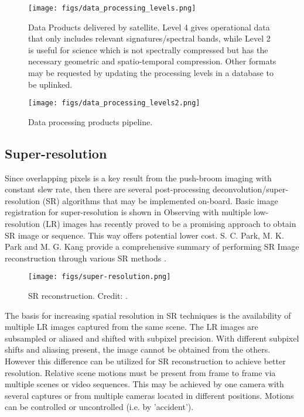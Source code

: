 \begin{figure}[htbp]
  \centering
      \texttt{[image: figs/data\_processing\_levels.png]}
  \caption{Data Products delivered by satellite. Level 4 gives operational data that only includes relevant signatures/spectral bands, while Level 2 is useful for science which is not spectrally compressed but has the necessary geometric and spatio-temporal compression. Other formats may be requested by updating the processing levels in a database to be uplinked.}
	\label{fig:data_processing_levels}
\end{figure}

\begin{figure}[htbp]
  \centering
      \texttt{[image: figs/data\_processing\_levels2.png]}
  \caption{Data processing products pipeline.}
	\label{fig:data_processing_levels2}
\end{figure}

\subsection{Super-resolution} \label{superresolution}
Since overlapping pixels is a key result from the push-broom imaging with constant slew rate, then there are several post-processing deconvolution/super-resolution (SR) algorithms that may be implemented on-board. Basic image registration for super-resolution is shown in Observing with multiple low-resolution (LR) images has recently proved to be a promising approach to obtain SR image or sequence. This way offers potential lower cost. S. C. Park, M. K. Park and M. G. Kang provide a comprehensive summary of performing SR Image reconstruction through various SR methods \cite{Park2003}.
\begin{figure}[htbp]
  \centering
      \texttt{[image: figs/super-resolution.png]}
  \caption{SR reconstruction. Credit: \cite{Park2003}.}
	\label{fig:SR}
\end{figure}
The basis for increasing spatial resolution in SR techniques is the availability of multiple LR images captured from the same scene. The LR images are subsampled or aliased and shifted with subpixel precision. With different subpixel shifts and aliasing present, the image cannot be obtained from the others. However this difference can be utilized for SR reconstruction to achieve better resolution. Relative scene motions must be present from frame to frame via multiple scenes or video sequences. This may be achieved by one camera with several captures or from multiple cameras located in different positions. Motions can be controlled or uncontrolled (i.e. by 'accident').

